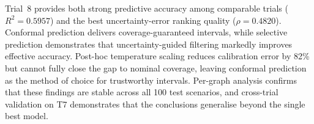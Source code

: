 Trial~8 provides both strong predictive accuracy among comparable trials ($R^2 = 0.5957$) and the best uncertainty-error ranking quality ($\rho = 0.4820$). Conformal prediction delivers coverage-guaranteed intervals, while selective prediction demonstrates that uncertainty-guided filtering markedly improves effective accuracy. Post-hoc temperature scaling reduces calibration error by 82\% but cannot fully close the gap to nominal coverage, leaving conformal prediction as the method of choice for trustworthy intervals. Per-graph analysis confirms that these findings are stable across all 100 test scenarios, and cross-trial validation on T7 demonstrates that the conclusions generalise beyond the single best model.
